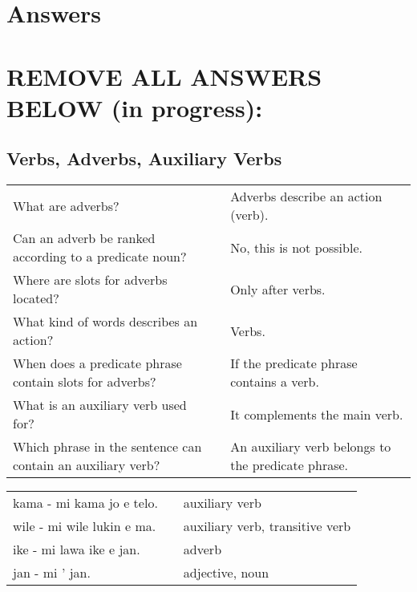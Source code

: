 
\section{Answers}
\printsolutions

\section*{REMOVE ALL ANSWERS BELOW (in progress):}

\subsection*{Verbs, Adverbs, Auxiliary Verbs}
\label{'adverbs'}

\begin{supertabular}{p{5,5cm}|ll}
    What are adverbs?                                           &  & Adverbs describe an action (verb).                 \\
    Can an adverb be ranked according to a predicate noun?      &  & No, this is not possible.                          \\
    Where are slots for adverbs located?                        &  & Only after verbs.                                  \\
    What kind of words describes an action?                     &  & Verbs.                                             \\
    When does a predicate phrase contain slots for adverbs?     &  & If the predicate phrase contains a verb.           \\
    What is an auxiliary verb used for?                         &  & It complements the main verb.                      \\
    Which phrase in the sentence can contain an auxiliary verb? &  & An auxiliary verb belongs to the predicate phrase. \\
\end{supertabular}

\begin{supertabular}{p{5,5cm}|ll}
    kama - mi kama jo e telo.  &  & auxiliary verb                  \\
    wile - mi wile lukin e ma. &  & auxiliary verb, transitive verb \\
    ike - mi lawa ike e jan.   &  & adverb                          \\
    jan - mi ' jan.            &  & adjective, noun                 \\
\end{supertabular}

